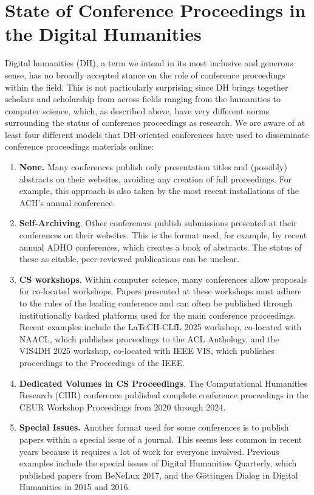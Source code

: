 \documentclass[final]{anthology-ch} %
\begin{document}
\section{State of Conference Proceedings in the Digital Humanities}

Digital humanities (DH), a term we intend in its most inclusive and
generous sense, has no broadly accepted stance on the role of conference
proceedings within the field. This is not particularly surprising since
DH brings together scholars and scholarship from across fields ranging
from the humanities to computer science, which, as described above, have
very different norms surrounding the status of conference proceedings as
research. We are aware of at least four different models that
DH-oriented conferences have used to disseminate conference proceedings
materials online:

\begin{enumerate}
\def\labelenumi{\arabic{enumi}.}
\item
  \textbf{None.} Many conferences publish only presentation titles and
  (possibly) abstracts on their websites, avoiding any creation of full
  proceedings. For example, this approach is also taken by the most
  recent installations of the ACH's annual conference.
\item
  \textbf{Self-Archiving}. Other conferences publish submissions
  presented at their conferences on their websites. This is the format
  used, for example, by recent annual ADHO conferences, which creates a
  book of abstracts. The status of these as citable, peer-reviewed
  publications can be unclear.
\item
  \textbf{CS workshops}. Within computer science, many conferences allow
  proposals for co-located workshops. Papers presented at these
  workshops must adhere to the rules of the leading conference and can
  often be published through institutionally backed platforms used for
  the main conference proceedings. Recent examples include the
  LaTeCH-CLfL 2025 workshop, co-located with NAACL, which publishes
  proceedings to the ACL Anthology, and the VIS4DH 2025 workshop,
  co-located with IEEE VIS, which publishes proceedings to the Proceedings of the IEEE.
\item
  \textbf{Dedicated Volumes in CS Proceedings}. The Computational
  Humanities Research (CHR) conference published complete conference
  proceedings in the CEUR Workshop Proceedings from 2020 through 2024.
\item
  \textbf{Special Issues.} Another format used for some conferences is
  to publish papers within a special issue of a journal. This seems less
  common in recent years because it requires a lot of work for everyone
  involved. Previous examples include the special issues of Digital
  Humanities Quarterly, which published papers from BeNeLux 2017, and
  the Göttingen Dialog in Digital Humanities in 2015 and 2016.
\end{enumerate}
\end{document}
